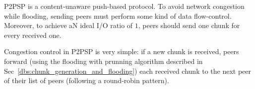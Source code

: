 P2PSP is a content-unaware push-based protocol. To avoid network
congestion while flooding, sending peers must perform some kind of
data flow-control. Moreover, to achieve aN ideal I/O ratio of $1$,
peers should send one chunk for every received one.

Congestion control in P2PSP is very simple: if a new chunk is
received, peers forward (using the flooding with prunning algorithm
described in Sec~\ref{dbs:chunk_generation_and_flooding}) each
received chunk to the next peer of their list of peers (following a
round-robin pattern).


\begin{comment}
A ${\cal P}_i$ forwards one or more chunks if and only if it has
received a chunk. For each received chunk $c_j$, ${\cal P}_i$: 1)
creates a list $l_{c_j}$ with the contents of $N'({\cal P}_i)$, and 2)
sends $c_j$ to $l_{c_j}[0]$ (the first element), and removes
$l_{c_j}[0]$. For each chunk reception, Step 2) is repeated for all
the previously created lists while they are not exhausted.

A solution is a forwarding algorithm based on the following
idea. Peers manage a list of chunks, where every item is a 2-tuple
($c_k$, $P_l$). The field $c_k$ represents the chunk that must be
flooded (if the node that has delivered the chunk is the splitter,
$c_k$ must be relayed towards all the neighbors, otherwise, $c_k$ must
be sent to all the neighbors except the peer that delivered $c_k$),
and the field $P_l$ the last neighbor to which $c_k$ was sent. For
every chunk received, a new tuple is appended to the list of chunks
and the rest of tuples are updated. The field $c_k$ remains constant
but $P_l$ is replaced by the next peer in the list of neighbors for
every received chunk.
\end{comment}
